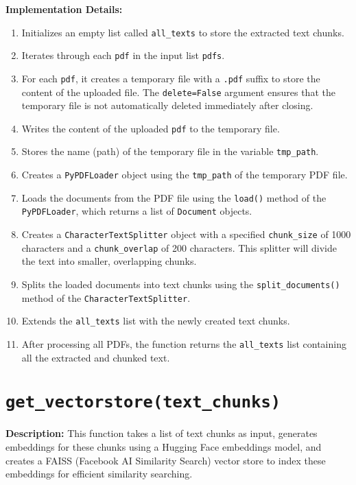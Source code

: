 \documentclass{article}
\begin{document}
\textbf{Implementation Details:}
\begin{enumerate}
    \item Initializes an empty list called \texttt{all\_texts} to store the extracted text chunks.
    \item Iterates through each \texttt{pdf} in the input list \texttt{pdfs}.
    \item For each \texttt{pdf}, it creates a temporary file with a \texttt{.pdf} suffix to store the content of the uploaded file. The \texttt{delete=False} argument ensures that the temporary file is not automatically deleted immediately after closing.
    \item Writes the content of the uploaded \texttt{pdf} to the temporary file.
    \item Stores the name (path) of the temporary file in the variable \texttt{tmp\_path}.
    \item Creates a \texttt{PyPDFLoader} object using the \texttt{tmp\_path} of the temporary PDF file.
    \item Loads the documents from the PDF file using the \texttt{load()} method of the \texttt{PyPDFLoader}, which returns a list of \texttt{Document} objects.
    \item Creates a \texttt{CharacterTextSplitter} object with a specified \texttt{chunk\_size} of 1000 characters and a \texttt{chunk\_overlap} of 200 characters. This splitter will divide the text into smaller, overlapping chunks.
    \item Splits the loaded documents into text chunks using the \texttt{split\_documents()} method of the \texttt{CharacterTextSplitter}.
    \item Extends the \texttt{all\_texts} list with the newly created text chunks.
    \item After processing all PDFs, the function returns the \texttt{all\_texts} list containing all the extracted and chunked text.
\end{enumerate}

\section*{\texttt{get\_vectorstore(text\_chunks)}}

\textbf{Description:} This function takes a list of text chunks as input, generates embeddings for these chunks using a Hugging Face embeddings model, and creates a FAISS (Facebook AI Similarity Search) vector store to index these embeddings for efficient similarity searching.
\end{document}
